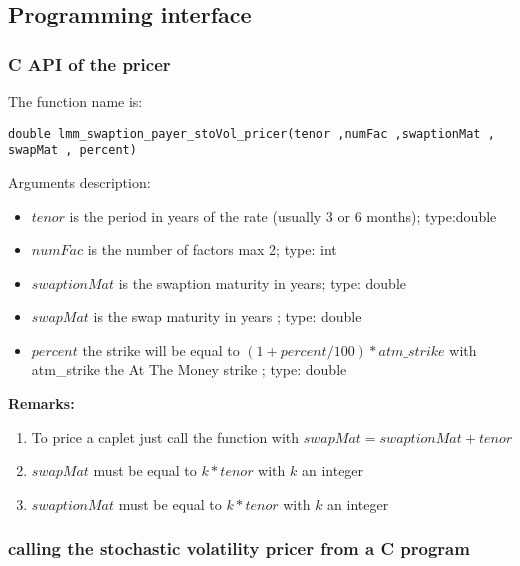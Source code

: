 \subsection{Programming interface}


\subsubsection{C API of the pricer}

The function name is: 
\small{
\begin{verbatim}
double lmm_swaption_payer_stoVol_pricer(tenor ,numFac ,swaptionMat , swapMat , percent) 
\end{verbatim}
}

Arguments description:
\begin{itemize}
\item $tenor$ is the period in years of the rate (usually 3 or 6 months); type:double 
\item $numFac$ is the number of factors max 2; type: int
\item $swaptionMat$ is the swaption maturity in years; type: double
\item $swapMat$ is the swap maturity in years ; type: double 
\item $percent$ the strike will be equal to $(1+percent/100)*atm\_strike$ with atm\_strike the At The Money strike ; type: double 
\end{itemize}

{\bf Remarks:}
\begin{enumerate}
\item To price a caplet just call the function with $swapMat=swaptionMat+tenor$
\item $swapMat$ must be equal to $k*tenor$ with $k$ an integer
\item $swaptionMat$ must be equal to $k*tenor$ with $k$ an integer
\end{enumerate}

\subsubsection{calling the stochastic volatility pricer from a C program}


